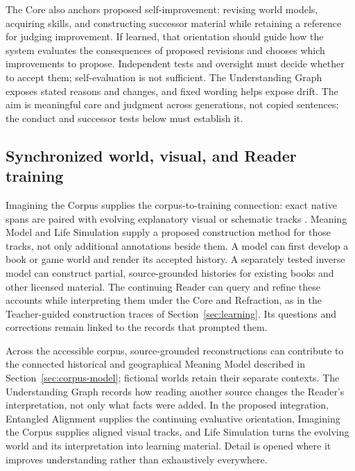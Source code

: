\documentclass[10pt]{article}
\begin{document}
The Core also anchors proposed self-improvement: revising world models,
acquiring skills, and constructing successor material while retaining a
reference for judging improvement. If learned, that orientation should guide
how the system evaluates the consequences of proposed revisions and chooses
which improvements to propose. Independent tests and oversight must
decide whether to accept them; self-evaluation is not sufficient. The
Understanding Graph exposes stated reasons and changes, and fixed wording
helps expose drift. The aim is meaningful care and judgment across generations,
not copied sentences; the conduct and successor tests below must establish it.

\subsection{Synchronized world, visual, and Reader training}
\label{sec:synchronized-training}

Imagining the Corpus supplies the corpus-to-training connection: exact native
spans are paired with evolving explanatory visual or schematic tracks
\cite{westerbergImagining2026}. Meaning Model and Life Simulation supply a
proposed construction method for those tracks, not only additional annotations
beside them. A model can first develop a book or game world and render its
accepted history. A separately tested inverse model can construct partial,
source-grounded histories for existing books and other licensed material.
The continuing Reader can query and refine these accounts while interpreting
them under the Core and Refraction, as in the Teacher-guided construction
traces of Section~\ref{sec:learning}. Its questions and corrections remain
linked to the records that prompted them.

Across the
accessible corpus, source-grounded reconstructions can contribute to the
connected historical and geographical Meaning Model described in
Section~\ref{sec:corpus-model}; fictional worlds retain their separate
contexts. The Understanding Graph records how reading another source changes
the Reader's interpretation, not only what facts were added. In the proposed
integration, Entangled Alignment supplies the continuing evaluative orientation, Imagining the
Corpus supplies aligned visual tracks, and Life Simulation turns the evolving
world and its interpretation into learning material. Detail is opened where
it improves understanding rather than exhaustively everywhere.
\end{document}
